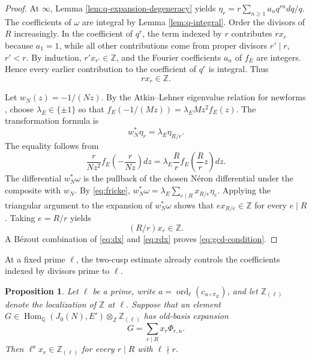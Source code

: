 \documentclass[12pt, letterpaper]{amsart}
\newtheorem{proposition}[theorem]{Proposition}
\theoremstyle{definition}
\theoremstyle{remark}
\newcommand{\Q}{\mathbb Q}
\newcommand{\Z}{\mathbb Z}
\newcommand{\Hom}{\operatorname{Hom}}
\DeclareMathOperator{\ord}{ord}
\numberwithin{equation}{section}
\begin{document}
\begin{proof}
At \(\infty\), Lemma \ref{lem:q-expansion-degeneracy} yields
\(\eta_r=r\sum_{n\ge1}a_nq^{rn}dq/q\).
The coefficients of \(\omega\) are integral by Lemma \ref{lem:q-integral}. Order
the divisors of \(R\) increasingly. In the coefficient of \(q^r\), the term
indexed by \(r\) contributes \(rx_r\) because \(a_1=1\), while all other
contributions come from proper divisors \(r'\mid r\), \(r'<r\). By induction,
\(r'x_{r'}\in\Z\), and the Fourier coefficients \(a_n\) of \(f_E\) are
integers. Hence every earlier contribution to the coefficient of \(q^r\) is
integral.
Thus
\begin{equation}\label{eq:dx}
        rx_r\in\Z .
\end{equation}

Let \(w_N(z)=-1/(Nz)\). By the Atkin--Lehner eigenvalue relation for newforms
\cite{AtkinLehner,Li}, choose \(\lambda_E\in\{\pm1\}\) so that
\(f_E(-1/(Mz))=\lambda_E Mz^2f_E(z)\).
The transformation formula is
\begin{equation}\label{eq:fricke}
        w_N^*\eta_r=\lambda_E\eta_{R/r}.
\end{equation}
The equality follows from
\[
        \frac{r}{Nz^2}f_E\left(-\frac{r}{Nz}\right)dz
        =\lambda_E\frac{R}{r}f_E\left(\frac{R}{r}z\right)dz.
\]
The differential \(w_N^*\omega\) is the pullback of the chosen N\'eron
differential under the composite with \(w_N\). By \eqref{eq:fricke},
\(w_N^*\omega=\lambda_E\sum_{e\mid R}x_{R/e}\eta_e\). Applying the
triangular argument to the expansion of \(w_N^*\omega\) shows that
\(ex_{R/e}\in\Z\) for every \(e\mid R\). Taking \(e=R/r\) yields
\begin{equation}\label{eq:rdx}
        (R/r)x_r\in\Z .
\end{equation}
A B\'ezout combination of \eqref{eq:dx} and \eqref{eq:rdx} proves
\eqref{eq:gcd-condition}.
\end{proof}

At a fixed prime \(\ell\), the two-cusp estimate already controls the
coefficients indexed by divisors prime to \(\ell\).

\begin{proposition}\label{prop:remove}
Let \(\ell\) be a prime, write \(a=\ord_\ell(c_{u\circ\pi_E})\), and let \(\Z_{(\ell)}\) denote
the localization of \(\Z\) at \(\ell\). Suppose that an element
\(G\in\Hom_\Q(J_0(N),E')\otimes_\Z\Z_{(\ell)}\) has old-basis expansion
\[
        G=\sum_{r\mid R}x_r\Phi_{r,u}.
\]
Then \(\ell^a x_r\in\Z_{(\ell)}\) for every \(r\mid R\) with \(\ell\nmid r\).
\end{proposition}
\end{document}
